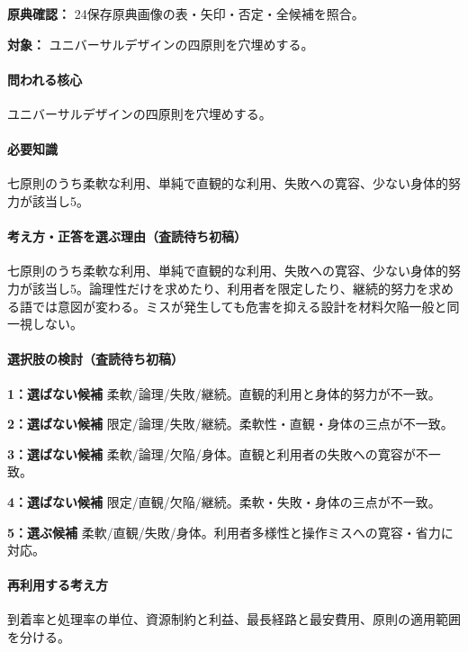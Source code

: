 \noindent\textbf{原典確認：} 24保存原典画像の表・矢印・否定・全候補を照合。\par

\noindent\textbf{対象：} ユニバーサルデザインの四原則を穴埋めする。\par

\paragraph{問われる核心} ユニバーサルデザインの四原則を穴埋めする。

\paragraph{必要知識} 七原則のうち柔軟な利用、単純で直観的な利用、失敗への寛容、少ない身体的努力が該当し5。

\paragraph{考え方・正答を選ぶ理由（査読待ち初稿）} 七原則のうち柔軟な利用、単純で直観的な利用、失敗への寛容、少ない身体的努力が該当し5。論理性だけを求めたり、利用者を限定したり、継続的努力を求める語では意図が変わる。ミスが発生しても危害を抑える設計を材料欠陥一般と同一視しない。

\paragraph{選択肢の検討（査読待ち初稿）}\mbox{}\par

\noindent\textbf{1：選ばない候補} 柔軟/論理/失敗/継続。直観的利用と身体的努力が不一致。\par

\noindent\textbf{2：選ばない候補} 限定/論理/失敗/継続。柔軟性・直観・身体の三点が不一致。\par

\noindent\textbf{3：選ばない候補} 柔軟/論理/欠陥/身体。直観と利用者の失敗への寛容が不一致。\par

\noindent\textbf{4：選ばない候補} 限定/直観/欠陥/継続。柔軟・失敗・身体の三点が不一致。\par

\noindent\textbf{5：選ぶ候補} 柔軟/直観/失敗/身体。利用者多様性と操作ミスへの寛容・省力に対応。\par

\paragraph{再利用する考え方} 到着率と処理率の単位、資源制約と利益、最長経路と最安費用、原則の適用範囲を分ける。

